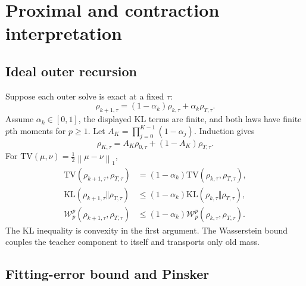 \documentclass[11pt,a4paper]{article}
\newcommand{\KL}{\mathrm{KL}}
\newcommand{\TV}{\mathrm{TV}}
\newcommand{\W}{\mathcal{W}}
\newcommand{\norm}[1]{\left\lVert #1 \right\rVert}
\theoremstyle{plain}
\theoremstyle{definition}
\begin{document}
\section{Proximal and contraction interpretation}
\label{sec:contraction}

\subsection{Ideal outer recursion}

Suppose each outer solve is exact at a fixed $\tau$:
\begin{equation}
\rho_{k+1,\tau}
=(1-\alpha_k)\rho_{k,\tau}+\alpha_k\rho_{T,\tau}.
\label{eq:outer-recursion}
\end{equation}
Assume $\alpha_k\in[0,1]$, the displayed KL terms are finite, and both laws have finite
$p$th moments for $p\ge1$.
Let $A_K=\prod_{j=0}^{K-1}(1-\alpha_j)$.  Induction gives
\begin{equation}
\rho_{K,\tau}=A_K\rho_{0,\tau}+(1-A_K)\rho_{T,\tau}.
\label{eq:outer-closed-form}
\end{equation}
For $\TV(\mu,\nu)=\frac12\norm{\mu-\nu}_1$,
\begin{align}
\TV(\rho_{k+1,\tau},\rho_{T,\tau})
&=(1-\alpha_k)\TV(\rho_{k,\tau},\rho_{T,\tau}),
\label{eq:tv-contraction}\\
\KL(\rho_{k+1,\tau}\Vert\rho_{T,\tau})
&\le(1-\alpha_k)\KL(\rho_{k,\tau}\Vert\rho_{T,\tau}),
\label{eq:kl-contraction}\\
\W_p^p(\rho_{k+1,\tau},\rho_{T,\tau})
&\le(1-\alpha_k)\W_p^p(\rho_{k,\tau},\rho_{T,\tau}).
\label{eq:wasserstein-contraction}
\end{align}
The KL inequality is convexity in the first argument.  The Wasserstein bound couples the
teacher component to itself and transports only old mass.

\subsection{Fitting-error bound and Pinsker}
\end{document}
